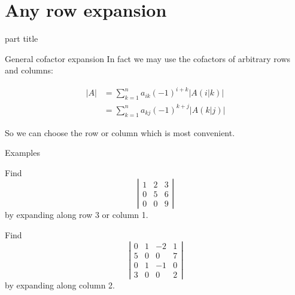 \documentclass{beamer}
\begin{document}
\section{Any row expansion}

\begin{frame}
  \begin{beamercolorbox}[sep=12pt,center]{part title}
    \insertsection\par
  \end{beamercolorbox}
\end{frame}

\begin{frame}{General cofactor expansion}
  In fact we may use the cofactors of arbitrary rows and columns:\vfill
  \begin{lemma}
    \begin{align*}
      \left|A\right| &= \sum_{k=1}^n a_{ik} (-1)^{i+k}\left|A(i| k)\right|\\
                     &= \sum_{k=1}^n a_{kj}(-1)^{k+j}\left|A(k| j)\right|
    \end{align*}
  \end{lemma}\vfill
  So we can choose the row or column which is most convenient.
\end{frame}

\begin{frame}{Examples}
  \begin{example}
    Find
    \begin{equation*}
      \left|
	\begin{array}{ccc}
          1&2&3\\
          0&5&6\\
          0&0&9
	\end{array}
      \right|
    \end{equation*}
    by expanding along row 3 or column 1.
  \end{example}\vfill
  \begin{example}
    Find
    \begin{equation*}
      \left|
	\begin{array}{cccc}
          0&1&-2&1\\
          5&0&0&7\\
          0&1&-1&0\\
          3&0&0&2
	\end{array}
      \right|
    \end{equation*}
    by expanding along column 2.
  \end{example}
\end{frame}
\end{document}
